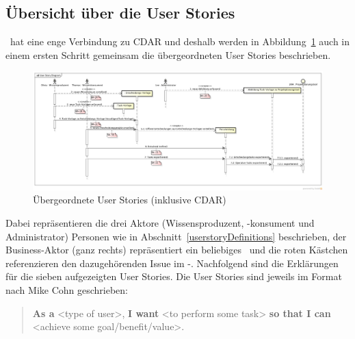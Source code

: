 		
	\begin{landscape}
	\subsection{Übersicht über die User Stories}
	
		\eeppi\ hat eine enge Verbindung zu CDAR und deshalb werden in Abbildung~\ref{fig:UserStoryDiagram} auch in einem ersten Schritt gemeinsam die übergeordneten User Stories beschrieben.
	
		\begin{figure}[H]
				\includegraphics[width=0.95\linewidth]{media/diagrams/UserStoryDiagram.png}
				\centering
				\caption{Übergeordnete User Stories (inklusive CDAR)}
				\label{fig:UserStoryDiagram}
		\end{figure}
		
		Dabei repräsentieren die drei Aktore (Wissensproduzent, -konsument und Administrator) Personen wie in Abschnitt~\ref{userstoryDefinitions} beschrieben,
		der Business-Aktor (ganz rechts) repräsentiert ein beliebiges \ppt\ und die roten Kästchen referenzieren den dazugehörenden Issue im \eeppi-\ppt.
		Nachfolgend sind die Erklärungen für die sieben aufgezeigten User Stories.
		Die User Stories sind jeweils im Format nach Mike Cohn\cite{rasmusson_agile_2012} geschrieben:
		\begin{quote}
			\textbf{As a} <type of user>,\newline
			\textbf{I want} <to perform some task>\newline
			\textbf{so that I can} <achieve some goal/benefit/value>.
		\end{quote}
	\end{landscape}

		